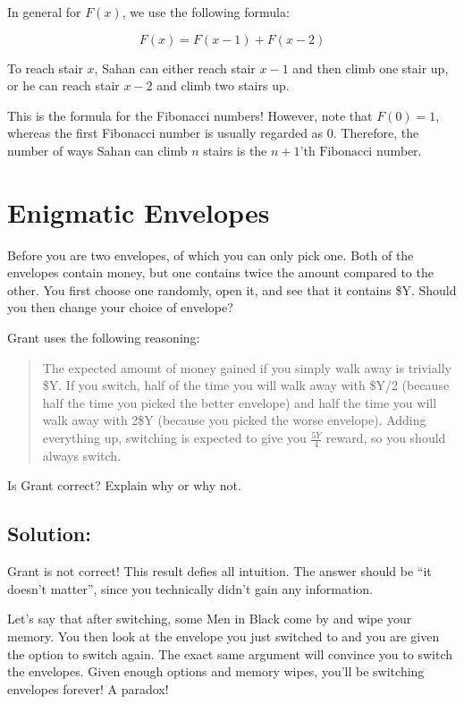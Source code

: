 \documentclass{article}
\begin{document}
In general for $F(x)$, we use the following formula:

$$F(x) = F(x - 1) + F(x - 2)$$

To reach stair $x$, Sahan can either reach stair $x - 1$ and then climb one stair up, or he can reach stair $x - 2$ and climb two stairs up.

This is the formula for the Fibonacci numbers! However, note that $F(0) = 1$, whereas the first Fibonacci number is usually regarded as $0$. Therefore, the number of ways Sahan can climb $n$ stairs is the $\boxed{n + 1 \text{'th Fibonacci number}}$.

\vspace{2cm}

\section{Enigmatic Envelopes}

Before you are two envelopes, of which you can only pick one. Both of the envelopes contain money, but one contains twice the amount compared to the other. You first choose one randomly, open it, and see that it contains \$Y. Should you then change your choice of envelope?

Grant uses the following reasoning:

\begin{quote}
    The expected amount of money gained if you simply walk away is trivially \$Y. If you switch, half of the time you will walk away with \$Y/2 (because half the time you picked the better envelope) and half the time you will walk away with 2\$Y (because you picked the worse envelope). Adding everything up, switching is expected to give you $\frac{5Y}{4}$ reward, so you should always switch.
\end{quote}

Is Grant correct? Explain why or why not.

\subsection{Solution:}

Grant is not correct! This result defies all intuition. The answer should be ``it doesn't matter'', since you technically didn't gain any information.

Let's say that after switching, some Men in Black come by and wipe your memory. You then look at the envelope you just switched to and you are given the option to switch again. The exact same argument will convince you to switch the envelopes. Given enough options and memory wipes, you'll be switching envelopes forever! A paradox!
\end{document}
